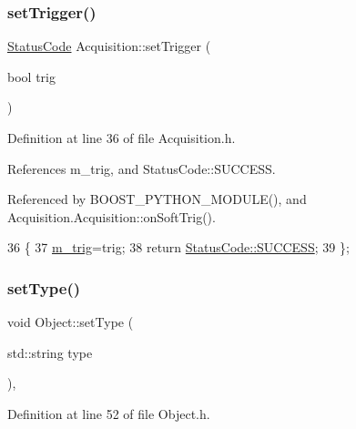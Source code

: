 \subsubsection{\texorpdfstring{set\+Trigger()}{setTrigger()}\hspace{0.1cm}{\footnotesize\ttfamily [2/2]}}
{\footnotesize\ttfamily \hyperlink{classStatusCode}{Status\+Code} Acquisition\+::set\+Trigger (\begin{DoxyParamCaption}\item[{bool}]{trig }\end{DoxyParamCaption})\hspace{0.3cm}{\ttfamily [inline]}}



Definition at line 36 of file Acquisition.\+h.



References m\+\_\+trig, and Status\+Code\+::\+S\+U\+C\+C\+E\+SS.



Referenced by B\+O\+O\+S\+T\+\_\+\+P\+Y\+T\+H\+O\+N\+\_\+\+M\+O\+D\+U\+L\+E(), and Acquisition.\+Acquisition\+::on\+Soft\+Trig().


\begin{DoxyCode}
36                                    \{
37     \hyperlink{classAcquisition_a953bdc1bf56206b6df33b648af32a24f}{m\_trig}=trig; 
38     \textcolor{keywordflow}{return} \hyperlink{classStatusCode_a6f565cbeadc76d14c72f047e5e85eb4badd0da38d3ba0d922efd1f4619bc37ad8}{StatusCode::SUCCESS};
39   \};
\end{DoxyCode}
\mbox{\label{classObject_aae534cc9d982bcb9b99fd505f2e103a5}} 
\subsubsection{\texorpdfstring{set\+Type()}{setType()}}
{\footnotesize\ttfamily void Object\+::set\+Type (\begin{DoxyParamCaption}\item[{std\+::string}]{type }\end{DoxyParamCaption})\hspace{0.3cm}{\ttfamily [inline]}, {\ttfamily [inherited]}}



Definition at line 52 of file Object.\+h.



